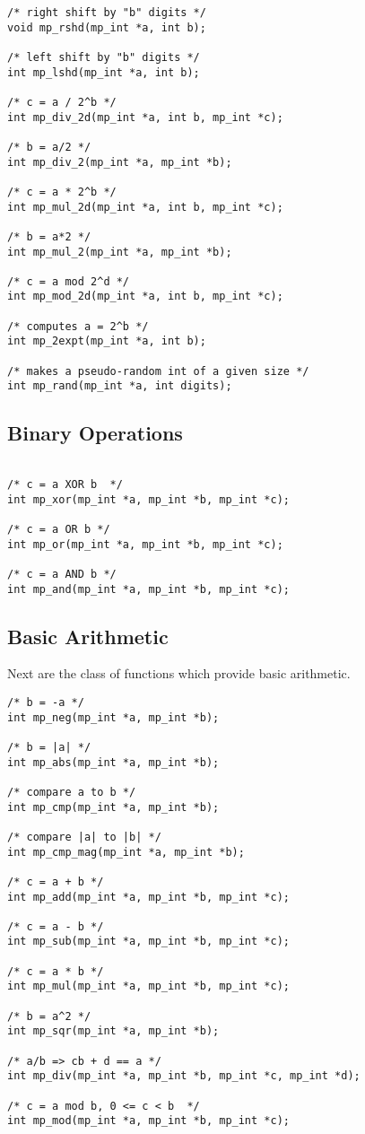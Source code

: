 \documentclass{article}
\begin{document}
\begin{verbatim}
/* right shift by "b" digits */
void mp_rshd(mp_int *a, int b);

/* left shift by "b" digits */
int mp_lshd(mp_int *a, int b);

/* c = a / 2^b */
int mp_div_2d(mp_int *a, int b, mp_int *c);

/* b = a/2 */
int mp_div_2(mp_int *a, mp_int *b);

/* c = a * 2^b */
int mp_mul_2d(mp_int *a, int b, mp_int *c);

/* b = a*2 */
int mp_mul_2(mp_int *a, mp_int *b);

/* c = a mod 2^d */
int mp_mod_2d(mp_int *a, int b, mp_int *c);

/* computes a = 2^b */
int mp_2expt(mp_int *a, int b);

/* makes a pseudo-random int of a given size */
int mp_rand(mp_int *a, int digits);

\end{verbatim}

\subsection{Binary Operations}

\begin{verbatim}

/* c = a XOR b  */
int mp_xor(mp_int *a, mp_int *b, mp_int *c);

/* c = a OR b */
int mp_or(mp_int *a, mp_int *b, mp_int *c);

/* c = a AND b */
int mp_and(mp_int *a, mp_int *b, mp_int *c);

\end{verbatim}

\subsection{Basic Arithmetic}

Next are the class of functions which provide basic arithmetic.

\begin{verbatim}
/* b = -a */
int mp_neg(mp_int *a, mp_int *b);

/* b = |a| */
int mp_abs(mp_int *a, mp_int *b);

/* compare a to b */
int mp_cmp(mp_int *a, mp_int *b);

/* compare |a| to |b| */
int mp_cmp_mag(mp_int *a, mp_int *b);

/* c = a + b */
int mp_add(mp_int *a, mp_int *b, mp_int *c);

/* c = a - b */
int mp_sub(mp_int *a, mp_int *b, mp_int *c);

/* c = a * b */
int mp_mul(mp_int *a, mp_int *b, mp_int *c);

/* b = a^2 */
int mp_sqr(mp_int *a, mp_int *b);

/* a/b => cb + d == a */
int mp_div(mp_int *a, mp_int *b, mp_int *c, mp_int *d);

/* c = a mod b, 0 <= c < b  */
int mp_mod(mp_int *a, mp_int *b, mp_int *c);
\end{verbatim}
\end{document}
